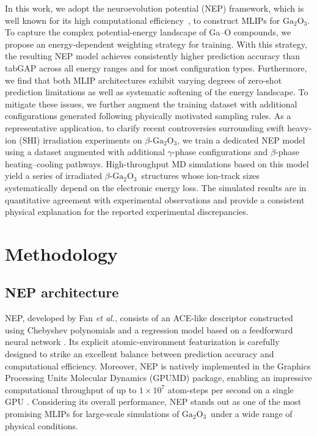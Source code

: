 \documentclass[%
reprint,
superscriptaddress,
 amsmath,amssymb,
 aps,
]{revtex4-2}
\newcommand{\ga}{$\text{Ga}_2\text{O}_3$}
\begin{document}
In this work, we adopt the neuroevolution potential (NEP) framework, which is well known
for its high computational efficiency~\cite{xu_gpumd_2025}, to construct MLIPs for \ga.
To capture the complex potential-energy landscape of Ga--O compounds, we propose an
energy-dependent weighting strategy for training.
With this strategy, the resulting NEP model achieves consistently higher prediction
accuracy than tabGAP across all energy ranges and for most configuration types.
Furthermore, we find that both MLIP architectures exhibit varying degrees of zero-shot
prediction limitations as well as systematic softening of the energy landscape.
To mitigate these issues, we further augment the training dataset with additional
configurations generated following physically motivated sampling rules.
As a representative application, to clarify recent controversies surrounding swift heavy-ion (SHI) 
irradiation experiments on $\beta$-\ga, we train a dedicated NEP model using a
dataset augmented with additional $\gamma$-phase configurations and $\beta$-phase
heating--cooling pathways.
High-throughput MD simulations based on this model yield a series of irradiated
$\beta$-\ga\ structures whose ion-track sizes systematically depend on the electronic
energy loss.
The simulated results are in quantitative agreement with experimental observations and
provide a consistent physical explanation for the reported experimental discrepancies.

\section{Methodology}

\subsection{NEP architecture}

NEP, developed by Fan \textit{et al.}, consists of an ACE-like descriptor constructed using 
Chebyshev polynomials and a regression model based on 
a feedforward neural network \cite{fan_neuroevolution_2021,fan_gpumd_2022,song_general-purpose_2024}. 
Its explicit atomic-environment featurization is carefully designed to strike an excellent 
balance between prediction accuracy and computational efficiency. 
Moreover, NEP is natively implemented in the Graphics Processing Units Molecular Dynamics 
(GPUMD) package, enabling an impressive computational throughput of up to $1\times10^{7}$ 
atom-steps per second on a single GPU \cite{xu_gpumd_2025}. 
Considering its overall performance, NEP stands out as one of the most promising 
MLIPs for large-scale simulations of \ga\ under a wide range of physical conditions.
\end{document}
